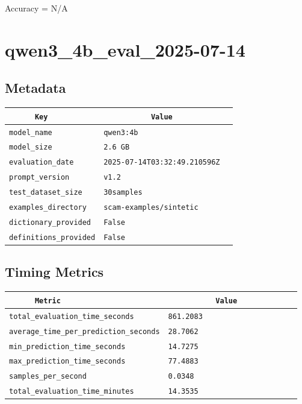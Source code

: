 \documentclass{article}
\begin{document}
\begin{center}
Accuracy = N/A
\end{center}

\section{qwen3\_4b\_eval\_2025-07-14}
\subsection{Metadata}

\begin{center}
\begin{tabular}{l | l} \hline
    \verb|      Key      | & \verb|           Value           | \\ \hline
    \hline
    \verb|model_name    | & \verb|qwen3:4b                     | \\ \hline
    \verb|model_size    | & \verb|2.6 GB                       | \\ \hline
    \verb|evaluation_date| & \verb|2025-07-14T03:32:49.210596Z  | \\ \hline
    \verb|prompt_version| & \verb|v1.2                         | \\ \hline
    \verb|test_dataset_size| & \verb|30samples                    | \\ \hline
    \verb|examples_directory| & \verb|scam-examples/sintetic       | \\ \hline
    \verb|dictionary_provided| & \verb|False                        | \\ \hline
    \verb|definitions_provided| & \verb|False                        | \\ \hline
\end{tabular}
\end{center}

\subsection{Timing Metrics}

\begin{center}
\begin{tabular}{l | l} \hline
    \verb|      Metric     | & \verb|           Value           | \\ \hline
    \hline
    \verb|total_evaluation_time_seconds| & \verb|861.2083                     | \\ \hline
    \verb|average_time_per_prediction_seconds| & \verb|28.7062                      | \\ \hline
    \verb|min_prediction_time_seconds| & \verb|14.7275                      | \\ \hline
    \verb|max_prediction_time_seconds| & \verb|77.4883                      | \\ \hline
    \verb|samples_per_second| & \verb|0.0348                       | \\ \hline
    \verb|total_evaluation_time_minutes| & \verb|14.3535                      | \\ \hline
\end{tabular}
\end{center}
\end{document}

